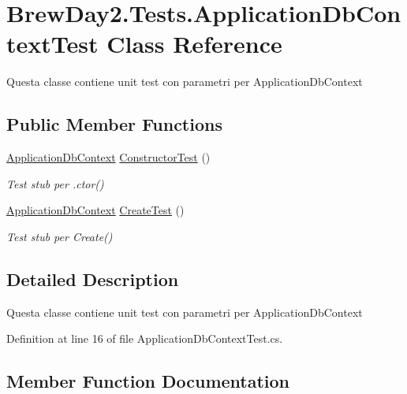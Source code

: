 \hypertarget{class_brew_day2_1_1_tests_1_1_application_db_context_test}{}\section{Brew\+Day2.\+Tests.\+Application\+Db\+Context\+Test Class Reference}
\label{class_brew_day2_1_1_tests_1_1_application_db_context_test}


Questa classe contiene unit test con parametri per Application\+Db\+Context 


\subsection*{Public Member Functions}
\begin{DoxyCompactItemize}
\item 
\mbox{\hyperlink{class_brew_day2_1_1_models_1_1_application_db_context}{Application\+Db\+Context}} \mbox{\hyperlink{class_brew_day2_1_1_tests_1_1_application_db_context_test_a32a68db634e51bbd70a08f7ceefe931d}{Constructor\+Test}} ()
\begin{DoxyCompactList}\small\item\em Test stub per .ctor()\end{DoxyCompactList}\item 
\mbox{\hyperlink{class_brew_day2_1_1_models_1_1_application_db_context}{Application\+Db\+Context}} \mbox{\hyperlink{class_brew_day2_1_1_tests_1_1_application_db_context_test_a926392fbe74512d4f613edcd4f18b4fa}{Create\+Test}} ()
\begin{DoxyCompactList}\small\item\em Test stub per Create()\end{DoxyCompactList}\end{DoxyCompactItemize}


\subsection{Detailed Description}
Questa classe contiene unit test con parametri per Application\+Db\+Context



Definition at line 16 of file Application\+Db\+Context\+Test.\+cs.



\subsection{Member Function Documentation}
\mbox{\label{class_brew_day2_1_1_tests_1_1_application_db_context_test_a32a68db634e51bbd70a08f7ceefe931d}} 
